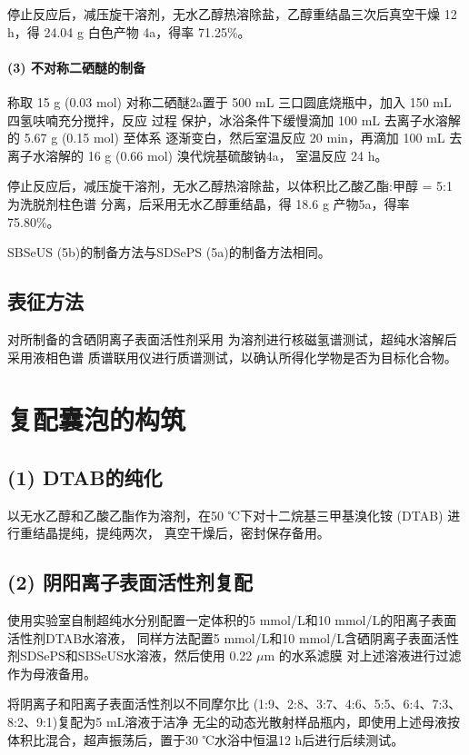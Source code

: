 \documentclass[bachelor,fandolfonts,replaceperiod]{jnuthesis}
\begin{document}
    停止反应后，减压旋干溶剂，无水乙醇热溶除盐，乙醇重结晶三次后真空干燥 12 h，得 24.04 g 白色产物
    4a，得率 71.25\%。
    
    \paragraph*{(3) 不对称二硒醚的制备}
    称取 15 g (0.03 mol) 对称二硒醚2a置于 500 mL 三口圆底烧瓶中，加入 150 mL 四氢呋喃充分搅拌，反应
    过程  保护，冰浴条件下缓慢滴加 100 mL 去离子水溶解的 5.67 g (0.15 mol) 至体系
    逐渐变白，然后室温反应 20 min，再滴加 100 mL 去离子水溶解的 16 g (0.66 mol) 溴代烷基硫酸钠4a，
    室温反应 24 h。
    
    停止反应后，减压旋干溶剂，无水乙醇热溶除盐，以体积比乙酸乙酯:甲醇 = 5:1 为洗脱剂柱色谱
    分离，后采用无水乙醇重结晶，得 18.6 g 产物5a，得率 75.80\%。
    
    SBSeUS (5b)的制备方法与SDSePS (5a)的制备方法相同。
    
    \subsection{表征方法}
    对所制备的含硒阴离子表面活性剂采用 为溶剂进行核磁氢谱测试，超纯水溶解后采用液相色谱
    质谱联用仪进行质谱测试，以确认所得化学物是否为目标化合物。
    
    \section{复配囊泡的构筑}
    \subsection*{(1) DTAB的纯化}
    以无水乙醇和乙酸乙酯作为溶剂，在50 ℃下对十二烷基三甲基溴化铵 (DTAB) 进行重结晶提纯，提纯两次，
    真空干燥后，密封保存备用。
    
    \subsection*{(2) 阴阳离子表面活性剂复配}
    使用实验室自制超纯水分别配置一定体积的5 mmol/L和10 mmol/L的阳离子表面活性剂DTAB水溶液，
    同样方法配置5 mmol/L和10 mmol/L含硒阴离子表面活性剂SDSePS和SBSeUS水溶液，然后使用 0.22 $\mu$m 的水系滤膜
    对上述溶液进行过滤作为母液备用。
    
    将阴离子和阳离子表面活性剂以不同摩尔比 (1:9、2:8、3:7、4:6、5:5、6:4、7:3、8:2、9:1)复配为5 mL溶液于洁净
    无尘的动态光散射样品瓶内，即使用上述母液按体积比混合，超声振荡后，置于30 ℃水浴中恒温12 h后进行后续测试。
        
\end{document}
